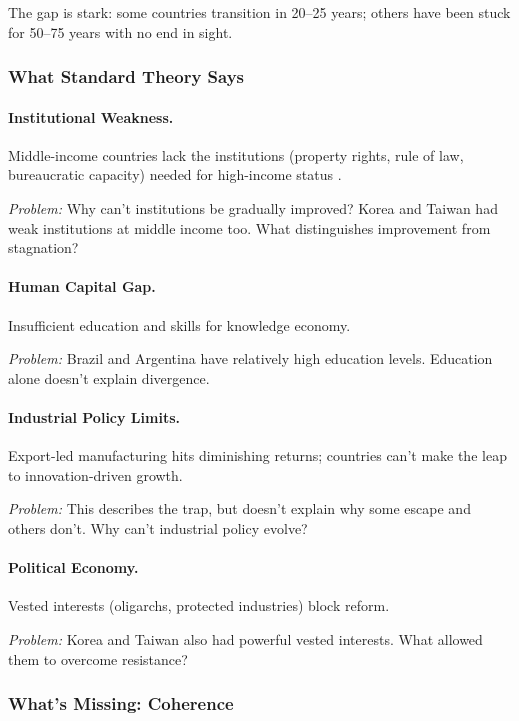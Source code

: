 The gap is stark: some countries transition in 20--25 years; others have been 
stuck for 50--75 years with no end in sight.

\subsubsection{What Standard Theory Says}

\paragraph{Institutional Weakness.}
Middle-income countries lack the institutions (property rights, rule of law, 
bureaucratic capacity) needed for high-income status \citep{acemoglu2012nations}.

\textit{Problem:} Why can't institutions be gradually improved? Korea and Taiwan 
had weak institutions at middle income too. What distinguishes improvement from stagnation?

\paragraph{Human Capital Gap.}
Insufficient education and skills for knowledge economy.

\textit{Problem:} Brazil and Argentina have relatively high education levels. 
Education alone doesn't explain divergence.

\paragraph{Industrial Policy Limits.}
Export-led manufacturing hits diminishing returns; countries can't make the 
leap to innovation-driven growth.

\textit{Problem:} This describes the trap, but doesn't explain why some escape 
and others don't. Why can't industrial policy evolve?

\paragraph{Political Economy.}
Vested interests (oligarchs, protected industries) block reform.

\textit{Problem:} Korea and Taiwan also had powerful vested interests. What 
allowed them to overcome resistance?

\subsubsection{What's Missing: Coherence}


